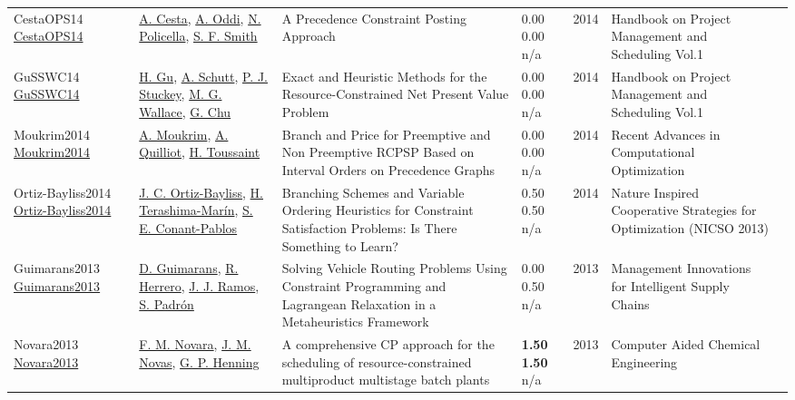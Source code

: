 {\begin{longtable}{p{3cm}p{5cm}p{10cm}p{1cm}rp{2.5cm}l}
CestaOPS14 \href{http://dx.doi.org/10.1007/978-3-319-05443-8_6}{CestaOPS14} & \hyperref[auth:a284]{A. Cesta}, \hyperref[auth:a282]{A. Oddi}, \hyperref[auth:a283]{N. Policella}, \hyperref[auth:a298]{S. F. Smith} & A Precedence Constraint Posting Approach & \noindent{}\textcolor{black!50}{0.00} \textcolor{black!50}{0.00} n/a & 2014 & Handbook on Project Management and Scheduling Vol.1 & \cite{CestaOPS14}\\
GuSSWC14 \href{http://dx.doi.org/10.1007/978-3-319-05443-8_14}{GuSSWC14} & \hyperref[auth:a336]{H. Gu}, \hyperref[auth:a124]{A. Schutt}, \hyperref[auth:a125]{P. J. Stuckey}, \hyperref[auth:a117]{M. G. Wallace}, \hyperref[auth:a343]{G. Chu} & Exact and Heuristic Methods for the Resource-Constrained Net Present Value Problem & \noindent{}\textcolor{black!50}{0.00} \textcolor{black!50}{0.00} n/a & 2014 & Handbook on Project Management and Scheduling Vol.1 & \cite{GuSSWC14}\\
Moukrim2014 \href{http://dx.doi.org/10.1007/978-3-319-12631-9_6}{Moukrim2014} & \hyperref[auth:a1169]{A. Moukrim}, \hyperref[auth:a788]{A. Quilliot}, \hyperref[auth:a1698]{H. Toussaint} & Branch and Price for Preemptive and Non Preemptive RCPSP Based on Interval Orders on Precedence Graphs & \noindent{}\textcolor{black!50}{0.00} \textcolor{black!50}{0.00} n/a & 2014 & Recent Advances in Computational Optimization & \cite{Moukrim2014}\\
Ortiz-Bayliss2014 \href{http://dx.doi.org/10.1007/978-3-319-01692-4_25}{Ortiz-Bayliss2014} & \hyperref[auth:a1778]{J. C. Ortiz-Bayliss}, \hyperref[auth:a1606]{H. Terashima-Marín}, \hyperref[auth:a1779]{S. E. Conant-Pablos} & \cellcolor{green!10}Branching Schemes and Variable Ordering Heuristics for Constraint Satisfaction Problems: Is There Something to Learn? & \noindent{}0.50 0.50 n/a & 2014 & Nature Inspired Cooperative Strategies for Optimization (NICSO 2013) & \cite{Ortiz-Bayliss2014}\\
Guimarans2013 \href{http://dx.doi.org/10.4018/978-1-4666-2461-0.ch007}{Guimarans2013} & \hyperref[auth:a1837]{D. Guimarans}, \hyperref[auth:a1838]{R. Herrero}, \hyperref[auth:a1839]{J. J. Ramos}, \hyperref[auth:a1840]{S. Padrón} & Solving Vehicle Routing Problems Using Constraint Programming and Lagrangean Relaxation in a Metaheuristics Framework & \noindent{}\textcolor{black!50}{0.00} 0.50 n/a & 2013 & Management Innovations for Intelligent Supply Chains & \cite{Guimarans2013}\\
Novara2013 \href{http://dx.doi.org/10.1016/b978-0-444-63234-0.50099-3}{Novara2013} & \hyperref[auth:a586]{F. M. Novara}, \hyperref[auth:a523]{J. M. Novas}, \hyperref[auth:a587]{G. P. Henning} & A comprehensive CP approach for the scheduling of resource-constrained multiproduct multistage batch plants & \noindent{}\textbf{1.50} \textbf{1.50} n/a & 2013 & Computer Aided Chemical Engineering & \cite{Novara2013}\\

\end{longtable}}
